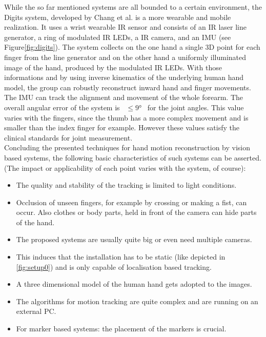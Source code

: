 While the so far mentioned systems are all bounded to a certain environment, the Digits system, developed by Chang et al. is a more wearable and mobile realization. It uses a wrist wearable \ac{IR} sensor \cite{Digits} and consists of an \ac{IR} laser line generator, a ring of modulated \ac{IR} LEDs, a \ac{IR} camera, and an \ac{IMU} (see Figure\ref{fig:digits}). The system collects on the one hand a single 3D point for each finger from the line generator and on the other hand a uniformly illuminated image of the hand, produced by the modulated \ac{IR} LEDs. With those informations and by using inverse kinematics of the underlying human hand model, the group can robustly reconstruct inward hand and finger movements. The \ac{IMU} can track the alignment and movement of the whole forearm. The overall angular error of the system is~ $ \leq \ang{9}$~ for the joint angles. This value varies with the fingers, since the thumb has a more complex movement and is smaller than the index finger for example. However these values satisfy the clinical standards for joint measurement.\\

Concluding the presented techniques for hand motion reconstruction by vision based systems, the following basic characteristics of such systems can be asserted. (The impact or applicability of each point varies with the system, of course):
\begin{itemize}
\item The quality and stability of the tracking is limited to light conditions.
\item Occlusion of unseen fingers, for example by crossing or making a fist, can occur. Also clothes or body parts, held in front of the camera can hide parts of the hand.
\item The proposed systems are usually quite big or even need multiple cameras.
\item This induces that the installation has to be static (like depicted in \ref{fig:setup0}) and is only capable of localisation based tracking.
\item A three dimensional model of the human hand gets adopted to the images.
\item The algorithms for motion tracking are quite complex and are running on an external PC.
\item For marker based systems: the placement of the markers is crucial.
\end{itemize}

